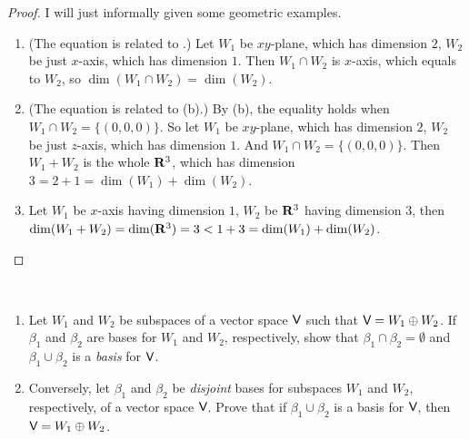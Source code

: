 \begin{proof}
I will just informally given some geometric examples.
\begin{enumerate}
\item (The equation is related to .) Let \(W_1\) be \(xy\)-plane, which has dimension \(2\), \(W_2\) be just \(x\)-axis, which has dimension \(1\).
    Then \(W_1 \cap W_2\) is \(x\)-axis, which equals to \(W_2\), so \(\dim(W_1 \cap W_2) = \dim(W_2)\).
\item (The equation is related to (b).) By (b), the equality holds when \(W_1 \cap W_2 = \{ (0, 0, 0) \}\).
    So let \(W_1\) be \(xy\)-plane, which has dimension \(2\), \(W_2\) be just \(z\)-axis, which has dimension \(1\).
    And \(W_1 \cap W_2 = \{ (0, 0, 0) \}\).
    Then \(W_1 + W_2\) is the whole \(\mathbf{R}^3\), which has dimension \(3 = 2 + 1 = \dim(W_1) + \dim(W_2)\).
\item Let \(W_1\) be \(x\)-axis having dimension \(1\), \(W_2\) be \(\mathbf{R}^3\) having dimension \(3\), then \(\dim(W_1 + W_2) = \dim(\mathbf{R}^3) = 3 < 1 + 3 = \dim(W_1) + \dim(W_2)\).
\end{enumerate}
\end{proof}

\begin{exercise} \label{exercise 1.6.33} \ 

\begin{enumerate}
\item Let \(W_1\) and \(W_2\) be subspaces of a vector space \(\textsf{V}\) such that \(\textsf{V} = W_1 \oplus W_2\).
    If \(\beta_1\) and \(\beta_2\) are bases for \(W_1\) and \(W_2\), respectively, show that \(\beta_1 \cap \beta_2 = \emptyset\) and \(\beta_1 \cup \beta_2\) is a \emph{basis} for \(\textsf{V}\).
\item Conversely, let \(\beta_1\) and \(\beta_2\) be \emph{disjoint} bases for subspaces \(W_1\) and \(W_2\), respectively, of a vector space \(\textsf{V}\).
    Prove that if \(\beta_1 \cup \beta_2\) is a basis for \(\textsf{V}\), then \(\textsf{V} = W_1 \oplus W_2\).
\end{enumerate}
\end{exercise}

